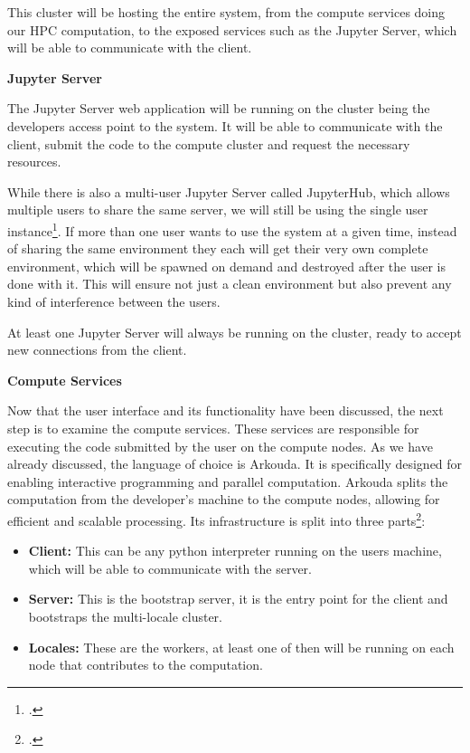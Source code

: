 This cluster will be hosting the entire system, from the compute services doing our \ac{HPC} computation,
to the exposed services such as the Jupyter Server, which will be able to communicate with the client.



\textbf{Jupyter Server}
\label{asp:jupyter_server}

The Jupyter Server web application will be running on the cluster being the developers access point to the system.
It will be able to communicate with the client, submit the code to the compute cluster and request the necessary resources.

While there is also a multi-user Jupyter Server called JupyterHub, which allows multiple users to share the same server, we will still be using the single user instance\footcite{jupyterhub-docsJupyterHub}.
If more than one user wants to use the system at a given time, instead of sharing the same environment they each will get their very own
complete environment, which will be spawned on demand and destroyed after the user is done with it.
This will ensure not just a clean environment but also prevent any kind of interference between the users.

At least one Jupyter Server will always be running on the cluster, ready to accept new connections from the client.


\textbf{Compute Services}
\label{asp:compute_services}

Now that the user interface and its functionality have been discussed, the next step is to examine the compute services.
These services are responsible for executing the code submitted by the user on the compute nodes.
As we have already discussed, the language of choice is Arkouda.
It is specifically designed for enabling interactive programming and parallel computation.
Arkouda splits the computation from the developer's machine to the compute nodes,
allowing for efficient and scalable processing.
Its infrastructure is split into three parts\footcite{arkouda-docsStartupArkoudaDocumentation}:


\begin{itemize}
    \item \textbf{Client:} This can be any python interpreter running on the users machine, which will be able to communicate with the server.
    \item \textbf{Server:} This is the bootstrap server, it is the entry point for the client and bootstraps the multi-locale cluster.
    \item \textbf{Locales:} These are the workers, at least one of then will be running on each node that contributes to the computation.
\end{itemize}

